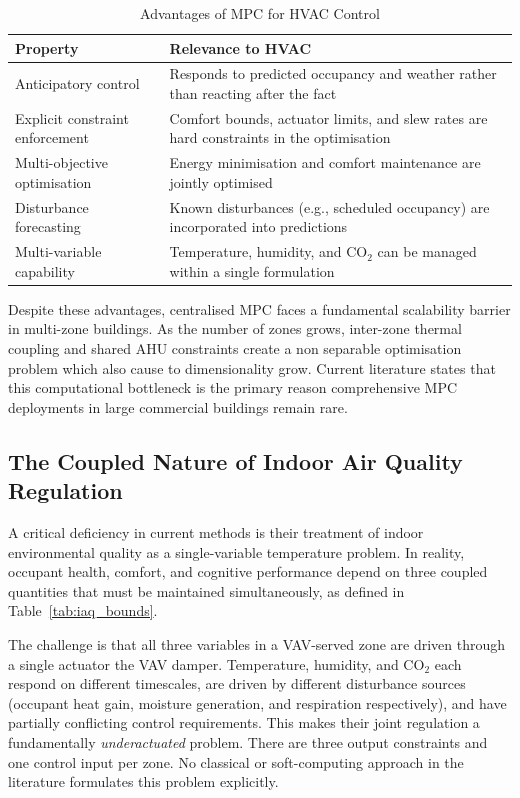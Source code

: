 \documentclass[12pt, a4paper]{article}
\begin{document}
	\begin{table}[h]
		\centering
		\caption{Advantages of MPC for HVAC Control}
		\label{tab:mpc_advantages}
		\begin{tabular}{lp{8cm}}
			\toprule
			\textbf{Property} & \textbf{Relevance to HVAC} \\
			\midrule
			Anticipatory control & Responds to predicted occupancy and weather rather than reacting after the fact \\
			Explicit constraint enforcement & Comfort bounds, actuator limits, and slew rates are hard constraints in the optimisation \\
			Multi-objective optimisation & Energy minimisation and comfort maintenance are jointly optimised \\
			Disturbance forecasting & Known disturbances (e.g., scheduled occupancy) are incorporated into predictions \\
			Multi-variable capability & Temperature, humidity, and CO$_2$ can be managed within a single formulation \\
			\bottomrule
		\end{tabular}
	\end{table}
	
	Despite these advantages, centralised MPC faces a fundamental scalability barrier in multi-zone buildings. As the number of zones grows, inter-zone thermal coupling and shared AHU constraints create a non separable optimisation problem which also cause to dimensionality grow. Current literature states that this computational bottleneck is the primary reason comprehensive MPC deployments in large commercial buildings remain rare.
	
	\subsection{The Coupled Nature of Indoor Air Quality Regulation}
	\label{sec:iaq}
	
	A critical deficiency in current methods is their treatment of indoor environmental quality as a single-variable temperature problem. In reality, occupant health, comfort, and cognitive performance depend on three coupled quantities that must be maintained simultaneously, as defined in Table~\ref{tab:iaq_bounds}.
	
	The challenge is that all three variables in a VAV-served zone are driven through a single actuator the VAV damper. Temperature, humidity, and CO$_2$ each respond on different timescales, are driven by different disturbance sources (occupant heat gain, moisture generation, and respiration respectively), and have partially conflicting control requirements. This makes their joint regulation a fundamentally \textit{underactuated} problem. There are three output constraints and one control input per zone. No classical or soft-computing approach in the literature formulates this problem explicitly.
	
\end{document}
